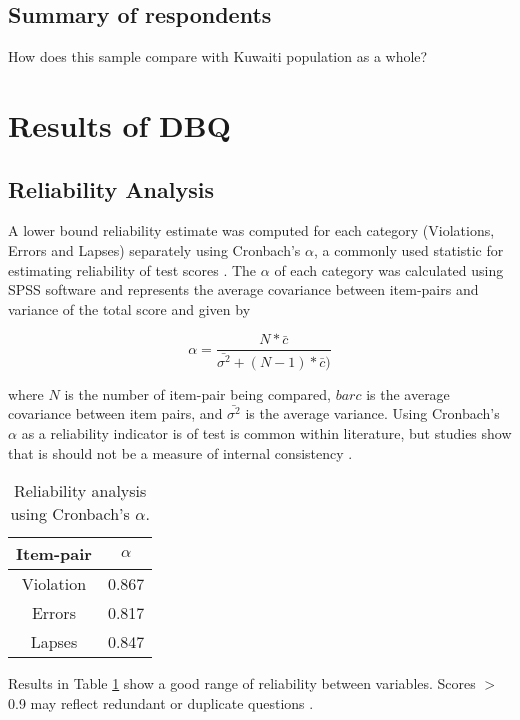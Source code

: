 \documentclass[preprint,12pt,a4paper,authoryear]{elsarticle}
\begin{document}
\begin{linenumbers}
\subsection{Summary of respondents}
How does this sample compare with Kuwaiti population as a whole? 

\section{Results of DBQ}

\subsection{Reliability Analysis}
A lower bound reliability estimate was computed for each category (Violations, Errors and Lapses) separately using Cronbach's $\alpha$,  a commonly used statistic for estimating reliability of test scores \citep{Warrens2014}. The $\alpha$ of each category was calculated using SPSS software and represents the average covariance between item-pairs and variance of the total score and given by

\begin{equation}
\label{eq:alpha}
\alpha = \frac{N*\bar{c}}{\bar{\sigma^{2}}+(N-1)*\bar{c})}
\end{equation}

\noindent
where $N$ is the number of item-pair being compared, $bar{c}$ is the average covariance between item pairs, and $\bar{\sigma^{2}}$ is the average variance. Using Cronbach's $\alpha$ as a reliability indicator is of test is common within literature, but studies show that is should not be a measure of internal consistency \citep{Sijtsma2009, Tavokol2011}.

\begin{table}[H]
\centering
\caption{Reliability analysis using Cronbach's $\alpha$.}
\label{tab:alpha}
\begin{tabular}{@{}cc@{}}
\toprule
\textbf{Item-pair} & \textbf{$\alpha$} \\ \midrule
Violation & 0.867 \\
Errors & 0.817 \\
Lapses & 0.847 \\ \bottomrule
\end{tabular}
\end{table} 

Results in Table \ref{tab:alpha} show a good range of reliability between variables. Scores $>$ 0.9 may reflect redundant or duplicate questions \citep{Streiner2003}.


\end{linenumbers}
\end{document}
